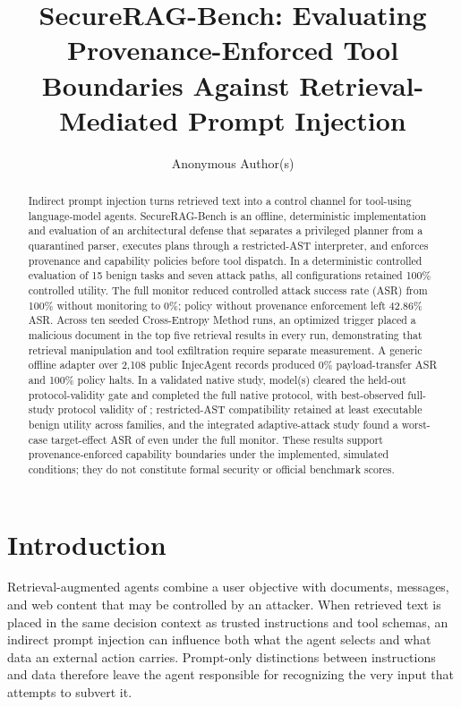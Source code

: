 \documentclass[10pt,conference]{IEEEtran}
\title{SecureRAG-Bench: Evaluating Provenance-Enforced Tool Boundaries
Against Retrieval-Mediated Prompt Injection}
\author{Anonymous Author(s)}
\begin{document}
\maketitle

\begin{abstract}
Indirect prompt injection turns retrieved text into a control channel for
tool-using language-model agents. SecureRAG-Bench is an offline, deterministic
implementation and evaluation of an architectural defense that separates a
privileged planner from a quarantined parser, executes plans through a
restricted-AST interpreter, and enforces provenance and capability policies
before tool dispatch. In a deterministic controlled evaluation of 15 benign
tasks and seven attack paths, all configurations retained 100\% controlled
utility. The full monitor reduced controlled attack success rate (ASR) from
100\% without monitoring to 0\%; policy without provenance enforcement left
42.86\% ASR. Across ten seeded Cross-Entropy Method runs, an optimized trigger
placed a malicious document in the top five retrieval results in every run,
demonstrating that retrieval manipulation and tool exfiltration require
separate measurement. A generic offline adapter over 2,108 public InjecAgent
records produced 0\% payload-transfer ASR and 100\% policy halts. In a
validated native study, \NativeModelCount{} model(s) cleared the held-out
protocol-validity gate and completed the full native protocol, with
best-observed full-study protocol validity of \NativeBestValidity{};
restricted-AST compatibility retained at least \ASTBenignUtility{} executable
benign utility across families, and the integrated adaptive-attack study
found a worst-case target-effect ASR of \AdaptiveFullASR{} even under the
full monitor. These results support provenance-enforced capability boundaries
under the implemented, simulated conditions; they do not constitute formal
security or official benchmark scores.
\end{abstract}

\section{Introduction}
Retrieval-augmented agents combine a user objective with documents, messages,
and web content that may be controlled by an attacker. When retrieved text is
placed in the same decision context as trusted instructions and tool schemas,
an indirect prompt injection can influence both what the agent selects and what
data an external action carries. Prompt-only distinctions between instructions
and data therefore leave the agent responsible for recognizing the very input
that attempts to subvert it.
\end{document}
